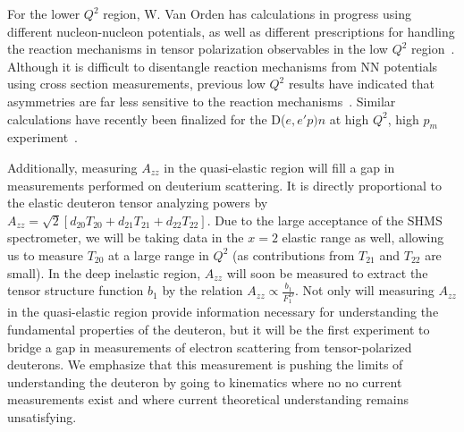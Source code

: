 For the lower $Q^2$ region, W. Van Orden has calculations in progress using different nucleon-nucleon potentials, as well as different prescriptions for handling the reaction mechanisms in tensor polarization observables in the low $Q^2$ region~\cite{vanorden-convo}. Although it is difficult to disentangle reaction mechanisms from NN potentials using cross section measurements, previous low $Q^2$ results have indicated that asymmetries are far less sensitive to the reaction mechanisms~\cite{Passchier:2001uc}. Similar calculations have recently been finalized for the D($e,e'p)n$ at high $Q^2$, high $p_m$ experiment~\cite{Ford:2014yua}. 

Additionally, measuring $A_{zz}$ in the quasi-elastic region will fill a gap in measurements performed on deuterium scattering. It is directly proportional to the elastic deuteron tensor analyzing powers by $A_{zz} = \sqrt{2} \left[ d_{20} T_{20} + d_{21} T_{21} + d_{22} T_{22}\right]$. Due to the large acceptance of the SHMS spectrometer, we will be taking data in the $x = 2$ elastic range as well, allowing us to measure $T_{20}$ at a large range in $Q^2$ (as contributions from $T_{21}$ and $T_{22}$ are small). In the deep inelastic region, $A_{zz}$ will soon be measured to extract the tensor structure function $b_1$ by the relation $A_{zz} \propto \frac{b_1}{F_1^D}$. Not only will measuring $A_{zz}$ in the quasi-elastic region provide information necessary for understanding the fundamental properties of the deuteron, but it will be the first experiment to bridge a gap in measurements of electron scattering from tensor-polarized deuterons. We emphasize that this measurement is pushing the limits of understanding the deuteron by going to kinematics where no no current measurements exist and where current theoretical understanding remains unsatisfying.



